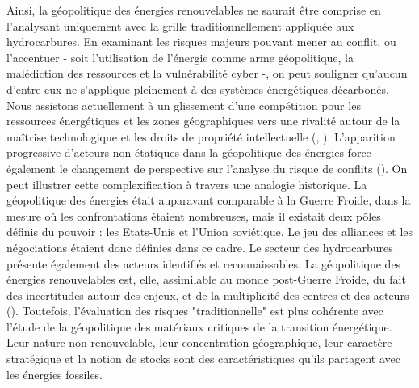 Ainsi, la géopolitique des énergies renouvelables ne saurait être comprise en l'analysant uniquement avec la grille traditionnellement appliquée aux hydrocarbures. En examinant les risques majeurs pouvant mener au conflit, ou l'accentuer - soit l'utilisation de l'énergie comme arme géopolitique, la malédiction des ressources et la vulnérabilité cyber -, on peut souligner qu'aucun d'entre eux ne s'applique pleinement à des systèmes énergétiques décarbonés. Nous assistons actuellement à un glissement d'une compétition pour les ressources énergétiques et les zones géographiques vers une rivalité autour de la maîtrise technologique et les droits de propriété intellectuelle (\cite{hache_vers_2019}, \cite{overland_geopolitics_2019}). L'apparition progressive d'acteurs non-étatiques dans la géopolitique des énergies force également le changement de perspective sur l'analyse du risque de conflits (\cite{mansson_resource_2015}). 
\smallbreak
On peut illustrer cette complexification à travers une analogie historique. La géopolitique des énergies était auparavant comparable à la Guerre Froide, dans la mesure où les confrontations étaient nombreuses, mais il existait deux pôles définis du pouvoir : les Etats-Unis et l'Union soviétique. Le jeu des alliances et les négociations étaient donc définies dans ce cadre. Le secteur des hydrocarbures présente également des acteurs identifiés et reconnaissables. La géopolitique des énergies renouvelables est, elle, assimilable au monde post-Guerre Froide, du fait des incertitudes autour des enjeux, et de la multiplicité des centres et des acteurs (\cite{paltsev_complicated_2016}).
\smallbreak
Toutefois, l'évaluation des risques "traditionnelle" est plus cohérente avec l'étude de la géopolitique des matériaux critiques de la transition énergétique. Leur nature non renouvelable, leur concentration géographique, leur caractère stratégique et la notion de stocks sont des caractéristiques qu'ils partagent avec les énergies fossiles. 